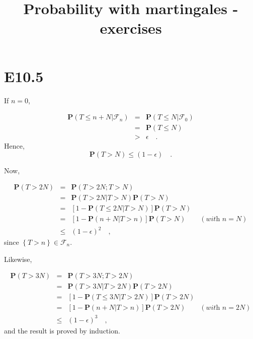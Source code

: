 \documentclass[11pt]{article} %
\title{Probability with martingales - exercises}
\author{}
\date{} %
\begin{document}
{\bf \maketitle \par}


\section*{E10.5}

\vspace{\baselineskip}

If $n=0$,

\begin{equation*}
\begin{array}{lcl}
\mathrm{\textbf{P}}\left(T \leq n+N | \mathcal{F}_{n}\right) &=& \mathrm{\textbf{P}}\left(T \leq N|\mathcal{F}_{0}\right)\\
&=& \mathrm{\textbf{P}}\left(T \leq N\right)\\
&>& \epsilon \quad. 
\end{array}
\end{equation*}
Hence,
\begin{equation*}
\mathrm{\textbf{P}}\left(T > N \right)\leq\left(1-\epsilon\right) \quad.
\end{equation*}

Now,

\begin{equation*}
\begin{array}{lcl}
\mathrm{\textbf{P}}\left(T > 2N \right)&=&\mathrm{\textbf{P}}\left(T > 2N; T > N\right)\\
&=&\mathrm{\textbf{P}}\left(T > 2N| T > N\right)\mathrm{\textbf{P}}\left(T >N\right)\\
&=&\left[1-\mathrm{\textbf{P}}\left(T \leq 2N | T>N\right) \right]\mathrm{\textbf{P}}\left(T>N\right)\\
&=&\left[1-\mathrm{\textbf{P}}\left(n+N|T>n\right)\right]\mathrm{\textbf{P}}\left(T>N\right)\quad \quad \left(\textit{with } n=N\right)\\
&\leq&\left(1-\epsilon\right)^{2} \quad,
\end{array}
\end{equation*}
since $\left\lbrace T>n\right\rbrace \in \mathcal{F}_{n}$.

Likewise,

\begin{equation*}
\begin{array}{lcl}
\mathrm{\textbf{P}}\left(T > 3N \right)&=&\mathrm{\textbf{P}}\left(T > 3N; T > 2N\right)\\
&=&\mathrm{\textbf{P}}\left(T > 3N| T > 2N\right)\mathrm{\textbf{P}}\left(T >2N\right)\\
&=&\left[1-\mathrm{\textbf{P}}\left(T \leq 3N | T>2N\right) \right]\mathrm{\textbf{P}}\left(T>2N\right)\\
&=&\left[1-\mathrm{\textbf{P}}\left(n+N|T>n\right)\right]\mathrm{\textbf{P}}\left(T>2N\right)\quad \quad \left(\textit{with } n=2N\right)\\
&\leq&\left(1-\epsilon\right)^{3} \quad,
\end{array}
\end{equation*}
and the result is proved by induction.\\
\end{document}
